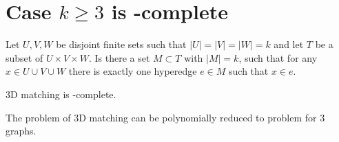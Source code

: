 \section{Case $k \geq 3$ is \NP-complete}\label{sec:NP}

\begin{problem}[3D matching]
Let $U,V,W$ be disjoint finite sets such that $|U|=|V|=|W|=k$ and let $T$ be a subset of $U\times V\times W$. Is there a set $M\subset T$ with $|M|=k$, such that for any $x\in U\cup V\cup W$ there is exactly one hyperedge $e\in M$ such that $x\in e$.
\end{problem}
\begin{fact}
3D matching is \NP-complete.
\end{fact}

\begin{theorem}
The problem of 3D matching can be polynomially reduced to \POISMST problem for 3 graphs. 
\end{theorem}
